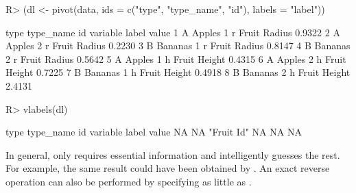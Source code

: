 \documentclass[article]{jss}
\newcommand{\fct}[1]{\code{#1()}}
\begin{document}
%
\begin{Schunk}
\begin{Sinput}
R> (dl <- pivot(data, ids = c("type", "type_name", "id"), labels = "label"))
\end{Sinput}
\begin{Soutput}
  type type_name id variable        label  value
1    A    Apples  1        r Fruit Radius 0.9322
2    A    Apples  2        r Fruit Radius 0.2230
3    B   Bananas  1        r Fruit Radius 0.8147
4    B   Bananas  2        r Fruit Radius 0.5642
5    A    Apples  1        h Fruit Height 0.4315
6    A    Apples  2        h Fruit Height 0.7225
7    B   Bananas  1        h Fruit Height 0.4918
8    B   Bananas  2        h Fruit Height 2.4131
\end{Soutput}
\begin{Sinput}
R> vlabels(dl)
\end{Sinput}
\begin{Soutput}
      type  type_name         id   variable      label      value 
        NA         NA "Fruit Id"         NA         NA         NA 
\end{Soutput}
\end{Schunk}
%
In general, \fct{pivot} only requires essential information and intelligently guesses the rest. For example, the same result could have been obtained by . An exact reverse operation can also be performed by specifying as little as . \newline
\end{document}
